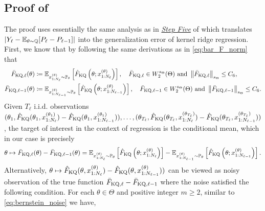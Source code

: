 \subsection{Proof of }\label{sec:proof_thm_level_nkq}
The proof uses essentially the same analysis as in \underline{\emph{Step Five}} of  which translates $| Y_\ell - \operatorname{\mathbb{E}}_{\theta \sim \mathbb{Q}}[P_\ell - P_{\ell-1}]|$ into the generalization error of kernel ridge regression. 
First, we know that by following the same derivations as in \eqref{eq:bar_F_norm} that 
\begin{align*}
    \bar{F}_{\text{KQ}, \ell}(\theta) &\coloneq \operatorname{\mathbb{E}}_{x_{1:N_\ell}^{(\theta)} \sim \mathbb{P}_{\theta} }\left[\hat{F}_{\text{KQ}} \left( \theta; x_{1:N_\ell}^{(\theta)} \right) \right], \quad \bar{F}_{\text{KQ}, \ell} \in W_2^{s_\Theta}(\Theta) \text{  and  } \left\| \bar{F}_{\text{KQ}, \ell} \right\|_{s_\Theta} \leq  C_6, \\
    \bar{F}_{\text{KQ}, \ell-1}(\theta) &\coloneq \operatorname{\mathbb{E}}_{x_{1:N_{\ell-1} }^{(\theta)} \sim \mathbb{P}_{\theta} } \left[ \hat{F}_{\text{KQ}} \left( \theta; x_{1:N_{\ell-1}}^{(\theta)} \right) \right], \quad \bar{F}_{\text{KQ}, \ell-1} \in W_2^{s_\Theta}(\Theta) \text{  and  } \left\| \bar{F}_{\text{KQ}, \ell-1} \right\|_{s_\Theta} \leq  C_6 .
\end{align*}
Given $T_\ell$ i.i.d. observations $(\theta_1, \hat{F}_{\text{KQ}}(\theta_1, x_{1:N_\ell}^{(\theta_1)}) - \hat{F}_{\text{KQ}}(\theta_1, x_{1:N_{\ell-1}}^{(\theta_1)})), \ldots, (\theta_{T_\ell}, \hat{F}_{\text{KQ}}(\theta_{T_\ell}, x_{1:N_\ell}^{(\theta_{T_\ell})}) - \hat{F}_{\text{KQ}}(\theta_{T_\ell}, x_{1:N_{\ell-1}}^{(\theta_{T_\ell})}))$, the target of interest in the context of regression is the conditional mean, which in our case is precisely 
\begin{align*}
    \theta \mapsto \bar{F}_{\text{KQ}, \ell}(\theta) - \bar{F}_{\text{KQ}, \ell-1}(\theta) = \operatorname{\mathbb{E}}_{x_{1:N_\ell}^{(\theta)} \sim \mathbb{P}_{\theta} }\left[\hat{F}_{\text{KQ}} \left( \theta; x_{1:N_\ell}^{(\theta)} \right) \right] - \operatorname{\mathbb{E}}_{x_{1:N_{\ell-1} }^{(\theta)} \sim \mathbb{P}_{\theta} } \left[ \hat{F}_{\text{KQ}} \left( \theta; x_{1:N_{\ell-1}}^{(\theta)} \right) \right] .
\end{align*}
Alternatively, $\theta \mapsto \hat{F}_{\text{KQ}}(\theta, x_{1:N_\ell}^{(\theta)}) - \hat{F}_{\text{KQ}}(\theta, x_{1:N_{\ell-1}}^{(\theta)}))$ can be viewed as noisy observation of the true function $\bar{F}_{\text{KQ}, \ell} - \bar{F}_{\text{KQ}, \ell-1}$ where the noise satisfied the following condition.
For each $\theta \in \Theta$ and positive integer $m \geq 2$, similar to \eqref{eq:bernstein_noise} we have,
